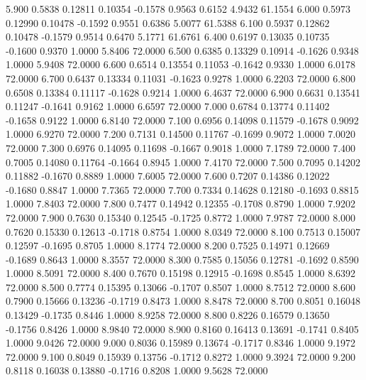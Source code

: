    5.900   0.5838   0.12811   0.10354  -0.1578   0.9563   0.6152   4.9432  61.1554
   6.000   0.5973   0.12990   0.10478  -0.1592   0.9551   0.6386   5.0077  61.5388
   6.100   0.5937   0.12862   0.10478  -0.1579   0.9514   0.6470   5.1771  61.6761
   6.400   0.6197   0.13035   0.10735  -0.1600   0.9370   1.0000   5.8406  72.0000
   6.500   0.6385   0.13329   0.10914  -0.1626   0.9348   1.0000   5.9408  72.0000
   6.600   0.6514   0.13554   0.11053  -0.1642   0.9330   1.0000   6.0178  72.0000
   6.700   0.6437   0.13334   0.11031  -0.1623   0.9278   1.0000   6.2203  72.0000
   6.800   0.6508   0.13384   0.11117  -0.1628   0.9214   1.0000   6.4637  72.0000
   6.900   0.6631   0.13541   0.11247  -0.1641   0.9162   1.0000   6.6597  72.0000
   7.000   0.6784   0.13774   0.11402  -0.1658   0.9122   1.0000   6.8140  72.0000
   7.100   0.6956   0.14098   0.11579  -0.1678   0.9092   1.0000   6.9270  72.0000
   7.200   0.7131   0.14500   0.11767  -0.1699   0.9072   1.0000   7.0020  72.0000
   7.300   0.6976   0.14095   0.11698  -0.1667   0.9018   1.0000   7.1789  72.0000
   7.400   0.7005   0.14080   0.11764  -0.1664   0.8945   1.0000   7.4170  72.0000
   7.500   0.7095   0.14202   0.11882  -0.1670   0.8889   1.0000   7.6005  72.0000
   7.600   0.7207   0.14386   0.12022  -0.1680   0.8847   1.0000   7.7365  72.0000
   7.700   0.7334   0.14628   0.12180  -0.1693   0.8815   1.0000   7.8403  72.0000
   7.800   0.7477   0.14942   0.12355  -0.1708   0.8790   1.0000   7.9202  72.0000
   7.900   0.7630   0.15340   0.12545  -0.1725   0.8772   1.0000   7.9787  72.0000
   8.000   0.7620   0.15330   0.12613  -0.1718   0.8754   1.0000   8.0349  72.0000
   8.100   0.7513   0.15007   0.12597  -0.1695   0.8705   1.0000   8.1774  72.0000
   8.200   0.7525   0.14971   0.12669  -0.1689   0.8643   1.0000   8.3557  72.0000
   8.300   0.7585   0.15056   0.12781  -0.1692   0.8590   1.0000   8.5091  72.0000
   8.400   0.7670   0.15198   0.12915  -0.1698   0.8545   1.0000   8.6392  72.0000
   8.500   0.7774   0.15395   0.13066  -0.1707   0.8507   1.0000   8.7512  72.0000
   8.600   0.7900   0.15666   0.13236  -0.1719   0.8473   1.0000   8.8478  72.0000
   8.700   0.8051   0.16048   0.13429  -0.1735   0.8446   1.0000   8.9258  72.0000
   8.800   0.8226   0.16579   0.13650  -0.1756   0.8426   1.0000   8.9840  72.0000
   8.900   0.8160   0.16413   0.13691  -0.1741   0.8405   1.0000   9.0426  72.0000
   9.000   0.8036   0.15989   0.13674  -0.1717   0.8346   1.0000   9.1972  72.0000
   9.100   0.8049   0.15939   0.13756  -0.1712   0.8272   1.0000   9.3924  72.0000
   9.200   0.8118   0.16038   0.13880  -0.1716   0.8208   1.0000   9.5628  72.0000
